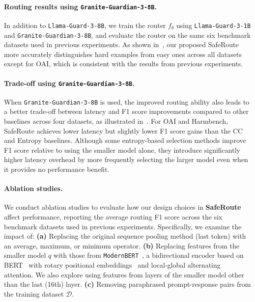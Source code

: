 \vspace{-0.05in}
\paragraph{Routing results using \texttt{Granite-Guardian-3-8B}.}
In addition to \texttt{Llama-Guard-3-8B}, we train the router $f_\theta$ using \texttt{Llama-Guard-3-1B} and \texttt{Granite-Guardian-3-8B}, and evaluate the router on the same six benchmark datasets used in previous experiments. As shown in~, our proposed SafeRoute  more accurately distinguishes hard examples from easy ones across all datasets except for OAI, which is consistent with the results from previous experiments.

\vspace{-0.05in}
\paragraph{Trade-off using \texttt{Granite-Guardian-3-8B}.}
When \texttt{Granite-Guardian-3-8B} is used, the improved routing ability also leads to a better trade-off between latency and F1 score improvements compared to other baselines across four datasets, as illustrated in~. For OAI and Harmbench, SafeRoute achieves lower latency but slightly lower F1 score gains than the CC and Entropy baselines. Although some entropy-based selection methods improve F1 score relative to using the smaller model alone, they introduce significantly higher latency overhead by more frequently selecting the larger model even when it provides no performance benefit.


\paragraph{Ablation studies.} 
We conduct ablation studies to evaluate how our design choices in \textbf{SafeRoute} affect performance, reporting the average routing F1 score across the six benchmark datasets used in previous experiments. Specifically, we examine the impact of:  
\textbf{(a)} Replacing the original sequence pooling method (last token) with an average, maximum, or minimum operator.  
\textbf{(b)} Replacing features from the smaller model $q$ with those from \texttt{ModernBERT}~\citep{modernbert}, a bidirectional encoder based on BERT~\citep{bert} with rotary positional embeddings~\citep{rope} and local-global alternating attention. We also explore using features from layers of the smaller model other than the last (16th) layer.  
\textbf{(c)} Removing paraphrased prompt-response pairs from the training dataset $\mathcal{D}$.  

